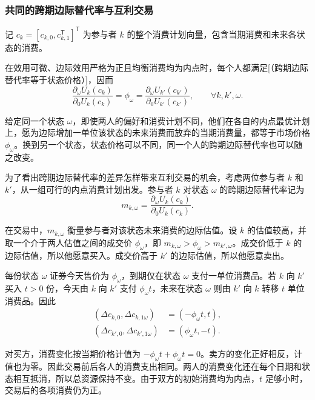 \subsubsection{共同的跨期边际替代率与互利交易}
\begin{tcolorbox}[knowledge,title=均衡中的共同跨期边际替代率]
记 $c_k=[c_{k,0},c_{k,1}^{\mathsf T}]^{\mathsf T}$ 为参与者 $k$ 的整个消费计划向量，包含当期消费和未来各状态的消费。

在效用可微、边际效用严格为正且均衡消费均为内点时，每个人都满足[（跨期边际替代率等于状态价格）]，因而
\begin{equation}
 \frac{\partial_\omega U_k(c_k)}{\partial_0U_k(c_k)}
 =\phi_\omega
 =\frac{\partial_\omega U_{k'}(c_{k'})}{\partial_0U_{k'}(c_{k'})},
 \qquad\forall k,k',\omega.\label{eq:wj-three-common-mrs}
\end{equation}

给定同一个状态 $\omega$，即使两人的偏好和消费计划不同，他们在各自的内点最优计划上，愿为边际增加一单位该状态的未来消费而放弃的当期消费量，都等于市场价格 $\phi_\omega$。换到另一个状态，状态价格可以不同，同一个人的跨期边际替代率也可以随之改变。
\end{tcolorbox}

为了看出跨期边际替代率的差异怎样带来互利交易的机会，考虑两位参与者 $k$ 和 $k'$，从一组可行的内点消费计划出发。参与者 $k$ 对状态 $\omega$ 的跨期边际替代率记为
\[
 m_{k,\omega}=\frac{\partial_\omega U_k(c_k)}{\partial_0U_k(c_k)}.
\]

在交易中，$m_{k,\omega}$ 衡量参与者对该状态未来消费的边际估值。设 $k$ 的估值较高，并取一个介于两人估值之间的成交价 $\phi_\omega$，即 $m_{k,\omega}>\phi_\omega>m_{k',\omega}$。成交价低于 $k$ 的边际估值，所以他愿意买入。成交价高于 $k'$ 的边际估值，所以他愿意卖出。

每份状态 $\omega$ 证券今天售价为 $\phi_\omega$，到期仅在状态 $\omega$ 支付一单位消费品。若 $k$ 向 $k'$ 买入 $t>0$ 份，今天由 $k$ 向 $k'$ 支付 $\phi_\omega t$，未来在状态 $\omega$ 则由 $k'$ 向 $k$ 转移 $t$ 单位消费品。因此
\[
 \begin{aligned}
 (\Delta c_{k,0},\Delta c_{k,1\omega})&=(-\phi_\omega t,t),\\
 (\Delta c_{k',0},\Delta c_{k',1\omega})&=(\phi_\omega t,-t).
 \end{aligned}
\]

对买方，消费变化按当期价格计值为 $-\phi_\omega t+\phi_\omega t=0$。卖方的变化正好相反，计值也为零。因此交易前后各人的消费支出相同。两人的消费变化还在每个日期和状态相互抵消，所以总资源保持不变。由于双方的初始消费均为内点，$t$ 足够小时，交易后的各项消费仍为正。

